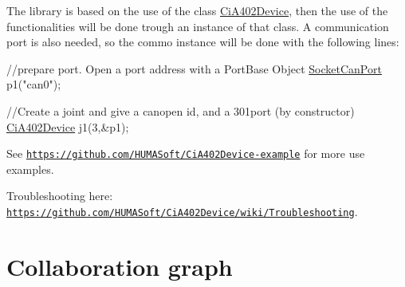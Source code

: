 The library is based on the use of the class {\ttfamily \hyperlink{classCiA402Device}{Ci\+A402\+Device}}, then the use of the functionalities will be done trough an instance of that class. A communication port is also needed, so the commo instance will be done with the following lines\+:


\begin{DoxyCode}
\textcolor{comment}{//prepare port. Open a port address with a PortBase Object}
\hyperlink{classSocketCanPort}{SocketCanPort} p1(\textcolor{stringliteral}{"can0"});

\textcolor{comment}{//Create a joint and give a canopen id, and a 301port (by constructor)}
\hyperlink{classCiA402Device}{CiA402Device} j1(3,&p1);
\end{DoxyCode}


See \href{https://github.com/HUMASoft/CiA402Device-example}{\tt https\+://github.\+com/\+H\+U\+M\+A\+Soft/\+Ci\+A402\+Device-\/example} for more use examples.

Troubleshooting here\+: \href{https://github.com/HUMASoft/CiA402Device/wiki/Troubleshooting}{\tt https\+://github.\+com/\+H\+U\+M\+A\+Soft/\+Ci\+A402\+Device/wiki/\+Troubleshooting}.

\section*{Collaboration graph}

 